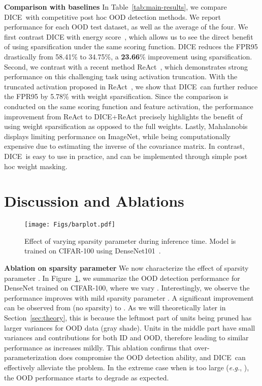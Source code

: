 \documentclass[runningheads]{llncs}
\newcommand{\methodAbbr}{DICE~}
\begin{document}
\noindent \textbf{Comparison with baselines} In Table~\ref{tab:main-results}, we compare \methodAbbr with competitive post hoc OOD detection methods. We report performance for each OOD test dataset, as well as the average of the four. 
We first contrast DICE with energy score~\cite{liu2020energy}, which allows us to see the direct benefit of using sparsification under the same scoring function. DICE reduces
the FPR95 drastically from 58.41\% to 34.75\%, a \textbf{23.66}\% improvement using sparsification.  
Second, we contrast with a recent method ReAct~\cite{sun2021react}, which demonstrates strong performance on this challenging task using activation truncation. 
With the truncated activation proposed in ReAct~\cite{sun2021react}, we show that \methodAbbr can further reduce the FPR95 by {5.78}\% with weight sparsification. 
Since the comparison is conducted on the same scoring function and feature activation, the performance improvement from ReAct to DICE+ReAct precisely highlights the benefit of using weight sparsification as opposed to the full weights.
Lastly, Mahalanobis displays limiting performance on ImageNet, while being computationally expensive due to estimating the inverse of the covariance matrix. In contrast, \methodAbbr is easy to use in practice, and can be implemented through simple {post hoc} weight masking. 

\section{Discussion and Ablations}
\label{sec:sparsification}
\begin{figure}[t]
	\begin{center}
		\texttt{[image: Figs/barplot.pdf]}
	\end{center}
	\vspace{-0.3cm}
	\caption{\small Effect of varying sparsity parameter  during inference time. Model is trained on CIFAR-100 using DenseNet101~\cite{huang2017densely}. 
	}
	\vspace{-0.4cm}
	\label{fig:sparsity}
\end{figure}

\noindent \textbf{Ablation on sparsity parameter } 
We now characterize  the effect of sparsity parameter .  In Figure~\ref{fig:sparsity}, we summarize the OOD detection performance for DenseNet trained on CIFAR-100, where we vary .  
Interestingly, we observe the performance improves  with mild sparsity parameter . A significant improvement can be observed from  (no sparsity) to . As we will theoretically later in Section~\ref{sec:theory}, this is because the leftmost part of units being pruned has larger variances for OOD data (gray shade). Units in the middle part have small variances and contributions for both ID and OOD, therefore leading to similar performance as  increases mildly. This ablation confirms that over-parameterization does compromise the OOD detection ability, and \methodAbbr can effectively alleviate the problem. In the extreme case when  is too large (\emph{e.g.}, ), the OOD performance starts to degrade as expected. \\
\end{document}
